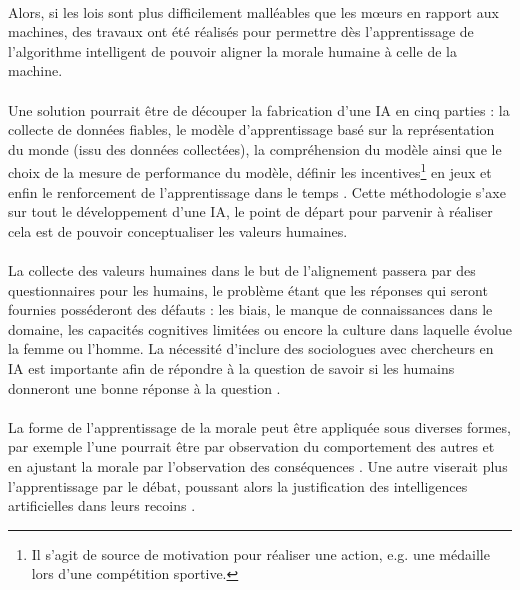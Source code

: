 \documentclass[10pt, french, a4paper]{report}
\begin{document}
\paragraph{}
Alors, si les lois sont plus difficilement malléables que les mœurs en rapport aux machines, des travaux ont été réalisés pour permettre dès l’apprentissage de l’algorithme intelligent de pouvoir aligner la morale humaine à celle de la machine.

\paragraph{}
Une solution pourrait être de découper la fabrication d’une IA en cinq parties : la collecte de données fiables, le modèle d’apprentissage basé sur la représentation du monde (issu des données collectées), la compréhension du modèle ainsi que le choix de la mesure de performance du modèle, définir les incentives\footnote{Il s’agit de source de motivation pour réaliser une action, e.g. une médaille lors d’une compétition sportive.} en jeux et enfin le renforcement de l’apprentissage dans le temps \citep{hoang_roadmap_2018}. Cette méthodologie s’axe sur tout le développement d’une IA, le point de départ pour parvenir à réaliser cela est de pouvoir conceptualiser les valeurs humaines.

\paragraph{}
La collecte des valeurs humaines dans le but de l’alignement passera par des questionnaires pour les humains, le problème étant que les réponses qui seront fournies posséderont des défauts : les biais, le manque de connaissances dans le domaine, les capacités cognitives limitées ou encore la culture dans laquelle évolue la femme ou l’homme. La nécessité d’inclure des sociologues avec chercheurs en IA est importante afin de répondre à la question de savoir si les humains donneront une bonne réponse à la question \citep{irving_ai_2019}.

\paragraph{}
La forme de l’apprentissage de la morale peut être appliquée sous diverses formes, par exemple l’une pourrait être par observation du comportement des autres et en ajustant la morale par l’observation des conséquences \citep{cointe_ethical_2017}. Une autre viserait plus l’apprentissage par le débat, poussant alors la justification des intelligences artificielles dans leurs recoins \citep{irving_ai_2019}.
\end{document}
